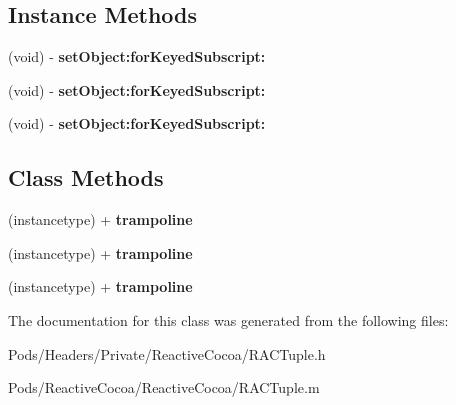 \subsection*{Instance Methods}
\begin{DoxyCompactItemize}
\item 
\mbox{\label{interface_r_a_c_tuple_unpacking_trampoline_af09b779da85a72667089d9fae364a93b}} 
(void) -\/ {\bfseries set\+Object\+:for\+Keyed\+Subscript\+:}
\item 
\mbox{\label{interface_r_a_c_tuple_unpacking_trampoline_af09b779da85a72667089d9fae364a93b}} 
(void) -\/ {\bfseries set\+Object\+:for\+Keyed\+Subscript\+:}
\item 
\mbox{\label{interface_r_a_c_tuple_unpacking_trampoline_af09b779da85a72667089d9fae364a93b}} 
(void) -\/ {\bfseries set\+Object\+:for\+Keyed\+Subscript\+:}
\end{DoxyCompactItemize}
\subsection*{Class Methods}
\begin{DoxyCompactItemize}
\item 
\mbox{\label{interface_r_a_c_tuple_unpacking_trampoline_ad7695510233abd5d9950e78ab965a52b}} 
(instancetype) + {\bfseries trampoline}
\item 
\mbox{\label{interface_r_a_c_tuple_unpacking_trampoline_ad7695510233abd5d9950e78ab965a52b}} 
(instancetype) + {\bfseries trampoline}
\item 
\mbox{\label{interface_r_a_c_tuple_unpacking_trampoline_ad7695510233abd5d9950e78ab965a52b}} 
(instancetype) + {\bfseries trampoline}
\end{DoxyCompactItemize}


The documentation for this class was generated from the following files\+:\begin{DoxyCompactItemize}
\item 
Pods/\+Headers/\+Private/\+Reactive\+Cocoa/R\+A\+C\+Tuple.\+h\item 
Pods/\+Reactive\+Cocoa/\+Reactive\+Cocoa/R\+A\+C\+Tuple.\+m\end{DoxyCompactItemize}
